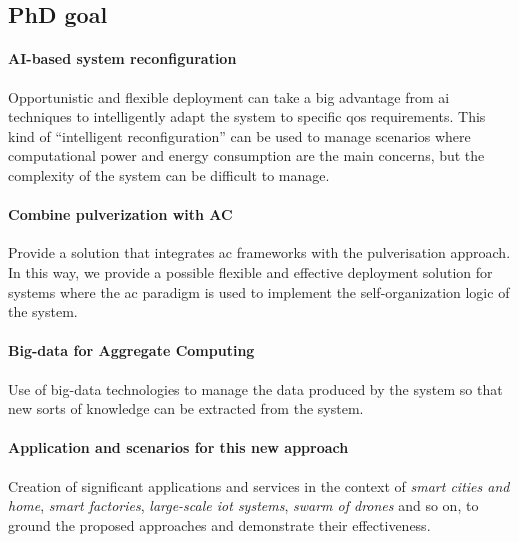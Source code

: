 \documentclass[12pt]{article}
\newcommand{\meta}[1]{{\color{blue}#1}}
\begin{document}
\subsection{PhD goal}

\paragraph{AI-based system reconfiguration}
\meta{
Opportunistic and flexible deployment can take a big advantage
from \ac{ai} techniques to intelligently adapt the system to specific \ac{qos} requirements.
%
This kind of ``intelligent reconfiguration'' can be used to manage scenarios
where computational power and energy consumption are the main concerns,
but the complexity of the system can be difficult to manage.
}

\paragraph{Combine pulverization with AC}
Provide a solution that integrates \ac{ac} frameworks with the pulverisation approach.
%
In this way,
we provide a possible flexible and effective deployment solution for systems
where the \ac{ac} paradigm is used to implement the self-organization logic of the system.

\paragraph{Big-data for Aggregate Computing}
\meta{
Use of big-data technologies to manage the data produced by the system
so that new sorts of knowledge can be extracted from the system.
}

\paragraph{Application and scenarios for this new approach}
Creation of significant applications and services in the context of \emph{smart cities and home},
\emph{smart factories}, \emph{large-scale \ac{iot} systems}, \emph{swarm of drones} and so on,
to ground the proposed approaches and demonstrate their effectiveness.
\end{document}
